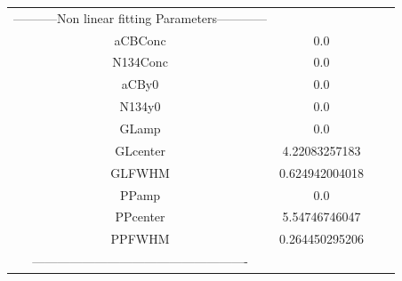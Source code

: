 \documentclass{article}
\begin{document}
\begin{tabular}{c c c c}

-----------Non linear fitting Parameters------------\\
aCBConc    &0.0\\
N134Conc   &0.0\\
aCBy0      &0.0\\
N134y0     &0.0\\
GLamp      &0.0\\
GLcenter   &4.22083257183\\
GLFWHM     &0.624942004018\\
PPamp      &0.0\\
PPcenter   &5.54746746047\\
PPFWHM     &0.264450295206\\
----------------------------------------------------\\


\end{tabular}
\end{document}
